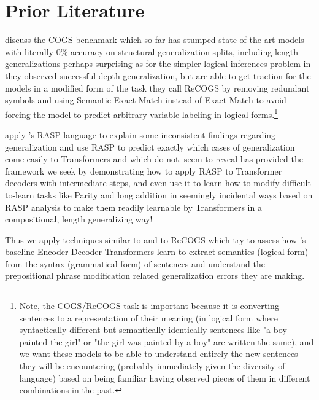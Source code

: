 \documentclass[11pt]{article}
\begin{document}
\section{Prior Literature}
\cite{Wu2023} discuss the COGS benchmark which so far has stumped state of the art models with literally 0\% accuracy on structural generalization splits, including length generalizations perhaps surprising as for the simpler logical inferences problem in \cite{Clark2020} they observed successful depth generalization, but \cite{Wu2023} are able to get traction for the models in a modified form of the task they call ReCOGS by removing redundant symbols and using Semantic Exact Match instead of Exact Match to avoid forcing the model to predict arbitrary variable labeling in logical forms.\footnote{Note, the COGS/ReCOGS task is important because it is converting sentences to a representation of their meaning (in logical form where syntactically different but semantically identically sentences like "a boy painted the girl" or "the girl was painted by a boy" are written the same), and we want these models to be able to understand entirely the new sentences they will be encountering (probably immediately given the diversity of language) based on being familiar having observed pieces of them in different combinations in the past.}


\cite{Zhou2024} apply \cite{Weiss2021}'s RASP language to explain some inconsistent findings regarding generalization and use RASP to predict exactly which cases of generalization come easily to Transformers and which do not. \cite{Zhou2024} seem to reveal \cite{Weiss2021} has provided the framework we seek by demonstrating how to apply RASP to Transformer decoders with intermediate steps, and even use it to learn how to modify difficult-to-learn tasks like Parity and long addition in seemingly incidental ways based on RASP analysis to make them readily learnable by Transformers in a compositional, length generalizing way!

Thus we apply techniques similar to \cite{Zhou2024} and \cite{Weiss2021} to ReCOGS which try to assess how \cite{Wu2023}'s baseline Encoder-Decoder Transformers learn to extract semantics (logical form) from the syntax (grammatical form) of sentences and understand the prepositional phrase modification related generalization errors they are making.
\end{document}
